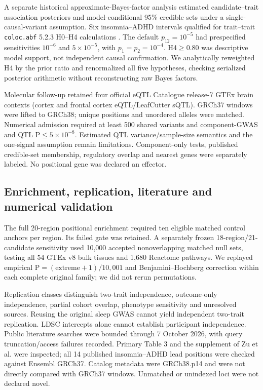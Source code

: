 \documentclass[11pt]{article}
\begin{document}
A separate historical approximate-Bayes-factor analysis estimated candidate--trait association posteriors and model-conditional 95\% credible sets under a single-causal-variant assumption. Six insomnia--ADHD intervals qualified for trait--trait \texttt{coloc.abf} 5.2.3 H0--H4 calculations \cite{colocabf}. The default $p_{12}=10^{-5}$ had prespecified sensitivities $10^{-6}$ and $5\times10^{-5}$, with $p_1=p_2=10^{-4}$. H4$\geq0.80$ was descriptive model support, not independent causal confirmation. We analytically reweighted H4 by the prior ratio and renormalized all five hypotheses, checking serialized posterior arithmetic without reconstructing raw Bayes factors.

Molecular follow-up retained four official eQTL Catalogue release-7 GTEx brain contexts (cortex and frontal cortex eQTL/LeafCutter sQTL). GRCh37 windows were lifted to GRCh38; unique positions and unordered alleles were matched. Numerical admission required at least 500 shared variants and component-GWAS and QTL P$\leq5\times10^{-8}$. Estimated QTL variance/sample-size semantics and the one-signal assumption remain limitations. Component-only tests, published credible-set membership, regulatory overlap and nearest genes were separately labeled. No positional gene was declared an effector.

\subsection*{Enrichment, replication, literature and numerical validation}
The full 20-region positional enrichment required ten eligible matched control anchors per region. Its failed gate was retained. A separately frozen 18-region/21-candidate sensitivity used 10,000 accepted nonoverlapping matched null sets, testing all 54 GTEx v8 bulk tissues and 1,680 Reactome pathways. We replayed empirical P$=(\mathrm{extreme}+1)/10{,}001$ and Benjamini--Hochberg correction within each complete original family; we did not rerun permutations.

Replication classes distinguish two-trait independence, outcome-only independence, partial cohort overlap, phenotype sensitivity and unresolved sources. Reusing the original sleep GWAS cannot yield independent two-trait replication. LDSC intercepts alone cannot establish participant independence. Public literature searches were bounded through 7 October 2026, with query truncation/access failures recorded. Primary Table 3 and the supplement of Zu et al. were inspected; all 14 published insomnia--ADHD lead positions were checked against Ensembl GRCh37. Catalog metadata were GRCh38.p14 and were not directly compared with GRCh37 windows. Unmatched or unindexed loci were not declared novel.
\end{document}
